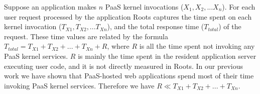 Suppose an application makes $n$ PaaS kernel invocations ($X_1, X_2, ... X_n$). For each user request processed
by the application Roots captures the time spent on each kernel invocation ($T_{X1}, T_{X2}, ... T_{Xn}$), and the 
total response time ($T_{total}$) of the request. These time values are related by the formula
$T_{total} = T_{X1} + T_{X2} + ... + T_{Xn} + R$, where $R$ is all the time spent not invoking any PaaS kernel
services. $R$ is mainly the time spent in the resident application server executing user code, and it is not
directly measured in Roots. In our previous
work we have shown that PaaS-hosted web applications spend most of their time invoking PaaS kernel services.
Therefore we have $R \ll T_{X1} + T_{X2} + ... + T_{Xn}$.

 